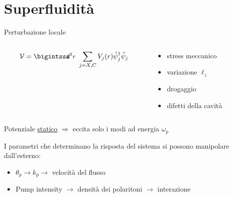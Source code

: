 \documentclass[10pt]{beamer}
\begin{document}
\section{Superfluidità}
\begin{frame}{Perturbazione locale}
\begin{columns}
	\begin{column}{.5\textwidth}
	  \[
	\mathcal{V} = \intr \sum_{j=X,C} V_j(r) \opsi_j^\dagger \opsi_j
	  \]
	\end{column}
	
	\begin{column}{.5\textwidth}
	    \begin{itemize}
	      \item stress meccanico
	      \item variazione $\ell_z$
	      \item drogaggio
	      \item difetti della cavità
	    \end{itemize}

	\end{column}
\end{columns}
\vspace{10pt}
Potenziale \underline{statico} $\Rightarrow$ eccita solo i modi ad energia $\omega_p$ 
\vskip20pt
\begin{minipage}{\textwidth}
  I parametri che determinano la risposta del sistema si possono manipolare dall'esterno:
\begin{itemize}
  \item $\theta_p \longrightarrow k_p \longrightarrow$ velocità del flusso
  \item Pump intensity $\longrightarrow$ densità dei polaritoni $\longrightarrow$ interazione
\end{itemize}
% 
% 
% 


\end{minipage}

 \end{frame}
\end{document}
